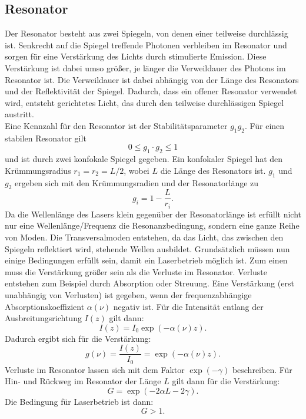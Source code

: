 \subsection{Resonator}\label{sec:resonator}
Der Resonator besteht aus zwei Spiegeln, von denen einer teilweise durchlässig ist. Senkrecht auf die Spiegel treffende Photonen verbleiben im Resonator und sorgen für 
eine Verstärkung des Lichts durch stimulierte Emission. Diese Verstärkung ist dabei umso größer, je länger die Verweildauer des Photons im Resonator ist.
Die Verweildauer ist dabei abhängig von der Länge des Resonators und der Reflektivität der Spiegel. Dadurch, dass ein offener Resonator verwendet wird, entsteht gerichtetes Licht, das durch den
teilweise durchlässigen Spiegel austritt.\\
Eine Kennzahl für den Resonator ist der Stabilitätsparameter $g_1 g_2$. Für einen stabilen Resonator gilt 
\begin{equation}
    \label{eqn:stab}
    0 \leq g_1 \cdot g_2 \leq 1
\end{equation}
und ist durch zwei konfokale Spiegel gegeben. Ein konfokaler Spiegel hat den Krümmungsradius $r_1 = r_2 = L/2$, wobei $L$ die Länge des Resonators ist. $g_1$ und $g_2$ ergeben sich mit den
Krümmungsradien und der Resonatorlänge zu
\begin{equation*}
    g_i = 1 - \frac{L}{r_i}.
\end{equation*}
Da die Wellenlänge des Lasers klein gegenüber der Resonatorlänge ist erfüllt nicht nur eine Wellenlänge/Frequenz die Resonanzbedingung, sondern eine ganze Reihe von Moden. Die Transversalmoden
entstehen, da das Licht, das zwischen den Spiegeln reflektiert wird, stehende Wellen ausbildet. 
Grundsätzlich müssen nun einige Bedingungen erfüllt sein, damit ein Laserbetrieb möglich ist. Zum einen muss die Verstärkung größer sein als die Verluste im Resonator. Verluste entstehen
zum Beispiel durch Absorption oder Streuung. Eine Verstärkung (erst unabhängig von Verlusten) ist gegeben, wenn der frequenzabhängige Absorptionskoeffizient $\alpha(\nu)$ negativ ist.\cite{demtroeder}
Für die Intensität entlang der Ausbreitungsrichtung $I(z)$ gilt dann:
\begin{equation*}
    I(z) = I_0 \exp\left(-\alpha(\nu)z\right).
\end{equation*}
Dadurch ergibt sich für die Verstärkung:
\begin{equation*}
    g(\nu) = \frac{I(z)}{I_0} = \exp\left(-\alpha(\nu)z\right).
\end{equation*}
Verluste im Resonator lassen sich mit dem Faktor $\exp(-\gamma)$ beschreiben. Für Hin- und Rückweg im Resonator der Länge $L$ gilt dann für die Verstärkung:
\begin{equation*}
    G = \exp(-2\alpha L - 2\gamma).
\end{equation*}
Die Bedingung für Laserbetrieb ist dann:
\begin{equation*}
    G > 1.
\end{equation*}
